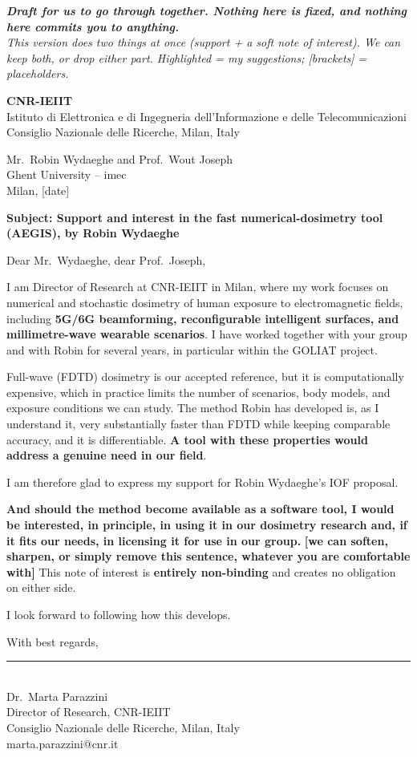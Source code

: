 \documentclass[11pt]{article}
\providecommand{\hl}[1]{\textbf{\textcolor{hlcol}{#1}}}
\begin{document}
\begin{center}\small\itshape
\hl{Draft for us to go through together. Nothing here is fixed, and nothing here commits you to anything.}\\
This version does two things at once (support + a soft note of interest). We can keep both, or drop either part. Highlighted = my suggestions; [brackets] = placeholders.
\end{center}
\bigskip

{\large\textbf{CNR-IEIIT}}\\
Istituto di Elettronica e di Ingegneria dell'Informazione e delle Telecomunicazioni\\
Consiglio Nazionale delle Ricerche, Milan, Italy\\[1.5em]

\begin{flushright}
Mr.\ Robin Wydaeghe and Prof.\ Wout Joseph\\
Ghent University -- imec\\[1em]
Milan, [date]
\end{flushright}

\bigskip
\textbf{Subject: Support and interest in the fast numerical-dosimetry tool
(\hl{AEGIS}), by Robin Wydaeghe}

\bigskip
Dear Mr.\ Wydaeghe, dear Prof.\ Joseph,

I am Director of Research at CNR-IEIIT in Milan, where my work focuses on numerical and
stochastic dosimetry of human exposure to electromagnetic fields, including \hl{5G/6G
beamforming, reconfigurable intelligent surfaces, and millimetre-wave wearable scenarios}. I
have worked together with your group and with Robin for several years, in particular within
the GOLIAT project.

Full-wave (FDTD) dosimetry is our accepted reference, but it is computationally expensive,
which in practice limits the number of scenarios, body models, and exposure conditions we can
study. The method Robin has developed is, as I understand it, very substantially faster than
FDTD while keeping comparable accuracy, and it is differentiable. \hl{A tool with these
properties would address a genuine need in our field}.

I am therefore glad to express my support for Robin Wydaeghe's IOF proposal.

\hl{And should the method become available as a software tool, I would be interested, in
principle, in using it in our dosimetry research and, if it fits our needs, in licensing it
for use in our group.} \hl{[we can soften, sharpen, or simply remove this sentence, whatever you are
comfortable with]} This note of interest is \hl{entirely non-binding} and creates no
obligation on either side.

I look forward to following how this develops.

\bigskip
With best regards,

\vspace{2.2cm}

\rule{6cm}{0.4pt}\\
Dr.\ Marta Parazzini\\
Director of Research, CNR-IEIIT\\
Consiglio Nazionale delle Ricerche, Milan, Italy\\
marta.parazzini@cnr.it
\end{document}
